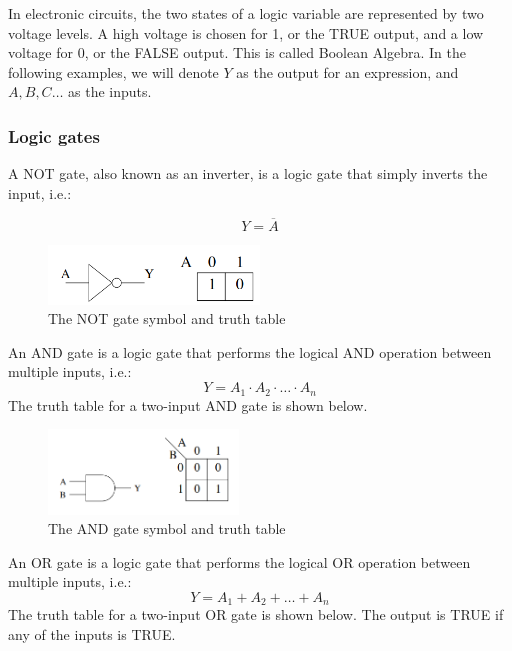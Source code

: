 \documentclass{article}
\begin{document}
In electronic circuits, the two states of a logic variable are represented by two voltage levels. A high voltage is chosen for 1, or the TRUE output, and a low voltage for 0, or the FALSE output. This is called Boolean Algebra. In the following examples, we will denote $Y$ as the output for an expression, and $A, B, C \dots$ as the inputs.

\subsubsection{Logic gates}

\begin{proposition}
    A NOT gate, also known as an inverter, is a logic gate that simply inverts the input, i.e.:

    \[ Y = \overline{A} \]
\end{proposition}

\begin{figure}[h]
    \centering
    \includegraphics[width = 0.5\textwidth]{images/not.png}
    \caption{The NOT gate symbol and truth table}
    \label{fig:enter-label}
\end{figure}

\begin{proposition}
    An AND gate is a logic gate that performs the logical AND operation between multiple inputs, i.e.:
    \[ Y = A_1 \cdot A_2 \cdot \ldots \cdot A_n \]
    The truth table for a two-input AND gate is shown below. 
\end{proposition}

\begin{figure}[h]
    \centering
    \includegraphics[width = 0.45\textwidth]{images/and.png}
    \caption{The AND gate symbol and truth table}
    \label{fig:enter-label}
\end{figure}

\begin{proposition}
    An OR gate is a logic gate that performs the logical OR operation between multiple inputs, i.e.:
    \[ Y = A_1 + A_2 + \ldots + A_n \]
    The truth table for a two-input OR gate is shown below. The output is TRUE if any of the inputs is TRUE.
\end{proposition}
\end{document}
